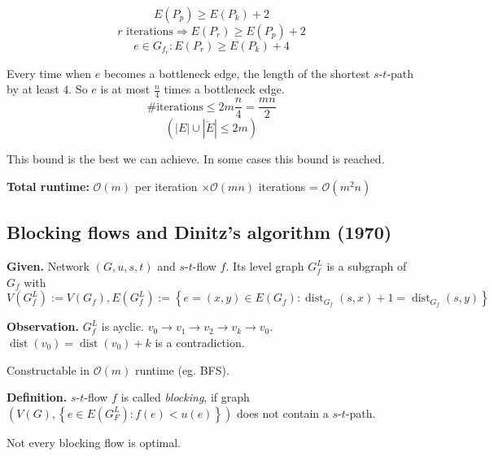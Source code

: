 \documentclass{article}
\newcommand{\set}[1]{\left\{#1\right\}}
\newcommand{\given}[1]{\textbf{Given.} #1\par}
\newcommand{\gath}[2]{$#1$-$#2$-path} %
\begin{document}
\[ E(P_p) \geq E(P_k) + 2 \]
\[ r \text{ iterations} \Rightarrow E(P_r) \geq E(P_p) + 2 \]
\[ e \in G_{f_r}: E(P_r) \geq E(P_k) + 4 \]

Every time when $e$ becomes a bottleneck edge, the length of the shortest \gath st by at least $4$. So $e$ is at most $\frac n4$ times a bottleneck edge.
\[
  \#\text{iterations} \leq 2m \frac n4 = \frac{mn}2
\] \[
  (|E| \cup |\overleftarrow{E}| \leq 2m)
\]

This bound is the best we can achieve. In some cases this bound is reached.

\textbf{Total runtime:}
  $\mathcal{O}(m)$ per iteration $\times \mathcal{O}(mn)$ iterations = $\mathcal{O}(m^2n)$

\subsection{Blocking flows and Dinitz's algorithm (1970)}
%
\given{Network $(G, u, s, t)$ and $s$-$t$-flow $f$. Its level graph $G_f^L$ is a subgraph of $G_f$ with
\[
  V(G_f^L) := V(G_f), E(G_f^L) := \set{e = (x, y) \in E(G_f):
    \operatorname{dist}_{G_f}(s, x) + 1 = \operatorname{dist}_{G_f}(s, y)
  }
\]}

\textbf{Observation.}
  $G_f^L$ is ayclic. $v_0 \rightarrow v_1 \rightarrow v_2 \rightarrow v_k \rightarrow v_0$. $\operatorname{dist}(v_0) = \operatorname{dist}(v_0) + k$ is a contradiction.

Constructable in $\mathcal{O}(m)$ runtime (eg. BFS).

\textbf{Definition.} $s$-$t$-flow $f$ is called \emph{blocking}, if graph $(V(G), \set{e \in E(G_F^L): f(e) < u(e)})$ does not contain a \gath st.

\clearpage
Not every blocking flow is optimal.
\end{document}
